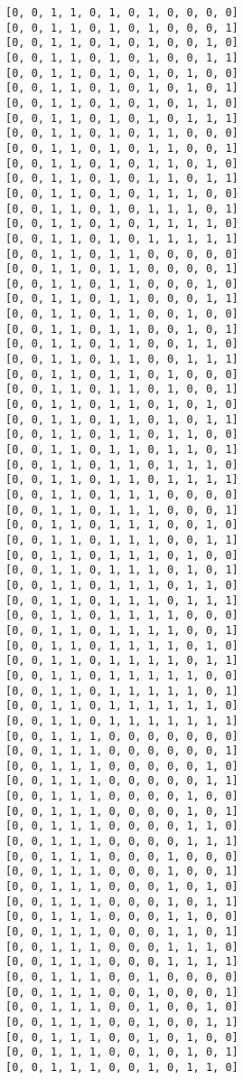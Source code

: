 \documentclass[11pt]{article}
\begin{document}
\begin{Verbatim}[commandchars=\\\{\}]
[0, 0, 1, 1, 0, 1, 0, 1, 0, 0, 0, 0]
[0, 0, 1, 1, 0, 1, 0, 1, 0, 0, 0, 1]
[0, 0, 1, 1, 0, 1, 0, 1, 0, 0, 1, 0]
[0, 0, 1, 1, 0, 1, 0, 1, 0, 0, 1, 1]
[0, 0, 1, 1, 0, 1, 0, 1, 0, 1, 0, 0]
[0, 0, 1, 1, 0, 1, 0, 1, 0, 1, 0, 1]
[0, 0, 1, 1, 0, 1, 0, 1, 0, 1, 1, 0]
[0, 0, 1, 1, 0, 1, 0, 1, 0, 1, 1, 1]
[0, 0, 1, 1, 0, 1, 0, 1, 1, 0, 0, 0]
[0, 0, 1, 1, 0, 1, 0, 1, 1, 0, 0, 1]
[0, 0, 1, 1, 0, 1, 0, 1, 1, 0, 1, 0]
[0, 0, 1, 1, 0, 1, 0, 1, 1, 0, 1, 1]
[0, 0, 1, 1, 0, 1, 0, 1, 1, 1, 0, 0]
[0, 0, 1, 1, 0, 1, 0, 1, 1, 1, 0, 1]
[0, 0, 1, 1, 0, 1, 0, 1, 1, 1, 1, 0]
[0, 0, 1, 1, 0, 1, 0, 1, 1, 1, 1, 1]
[0, 0, 1, 1, 0, 1, 1, 0, 0, 0, 0, 0]
[0, 0, 1, 1, 0, 1, 1, 0, 0, 0, 0, 1]
[0, 0, 1, 1, 0, 1, 1, 0, 0, 0, 1, 0]
[0, 0, 1, 1, 0, 1, 1, 0, 0, 0, 1, 1]
[0, 0, 1, 1, 0, 1, 1, 0, 0, 1, 0, 0]
[0, 0, 1, 1, 0, 1, 1, 0, 0, 1, 0, 1]
[0, 0, 1, 1, 0, 1, 1, 0, 0, 1, 1, 0]
[0, 0, 1, 1, 0, 1, 1, 0, 0, 1, 1, 1]
[0, 0, 1, 1, 0, 1, 1, 0, 1, 0, 0, 0]
[0, 0, 1, 1, 0, 1, 1, 0, 1, 0, 0, 1]
[0, 0, 1, 1, 0, 1, 1, 0, 1, 0, 1, 0]
[0, 0, 1, 1, 0, 1, 1, 0, 1, 0, 1, 1]
[0, 0, 1, 1, 0, 1, 1, 0, 1, 1, 0, 0]
[0, 0, 1, 1, 0, 1, 1, 0, 1, 1, 0, 1]
[0, 0, 1, 1, 0, 1, 1, 0, 1, 1, 1, 0]
[0, 0, 1, 1, 0, 1, 1, 0, 1, 1, 1, 1]
[0, 0, 1, 1, 0, 1, 1, 1, 0, 0, 0, 0]
[0, 0, 1, 1, 0, 1, 1, 1, 0, 0, 0, 1]
[0, 0, 1, 1, 0, 1, 1, 1, 0, 0, 1, 0]
[0, 0, 1, 1, 0, 1, 1, 1, 0, 0, 1, 1]
[0, 0, 1, 1, 0, 1, 1, 1, 0, 1, 0, 0]
[0, 0, 1, 1, 0, 1, 1, 1, 0, 1, 0, 1]
[0, 0, 1, 1, 0, 1, 1, 1, 0, 1, 1, 0]
[0, 0, 1, 1, 0, 1, 1, 1, 0, 1, 1, 1]
[0, 0, 1, 1, 0, 1, 1, 1, 1, 0, 0, 0]
[0, 0, 1, 1, 0, 1, 1, 1, 1, 0, 0, 1]
[0, 0, 1, 1, 0, 1, 1, 1, 1, 0, 1, 0]
[0, 0, 1, 1, 0, 1, 1, 1, 1, 0, 1, 1]
[0, 0, 1, 1, 0, 1, 1, 1, 1, 1, 0, 0]
[0, 0, 1, 1, 0, 1, 1, 1, 1, 1, 0, 1]
[0, 0, 1, 1, 0, 1, 1, 1, 1, 1, 1, 0]
[0, 0, 1, 1, 0, 1, 1, 1, 1, 1, 1, 1]
[0, 0, 1, 1, 1, 0, 0, 0, 0, 0, 0, 0]
[0, 0, 1, 1, 1, 0, 0, 0, 0, 0, 0, 1]
[0, 0, 1, 1, 1, 0, 0, 0, 0, 0, 1, 0]
[0, 0, 1, 1, 1, 0, 0, 0, 0, 0, 1, 1]
[0, 0, 1, 1, 1, 0, 0, 0, 0, 1, 0, 0]
[0, 0, 1, 1, 1, 0, 0, 0, 0, 1, 0, 1]
[0, 0, 1, 1, 1, 0, 0, 0, 0, 1, 1, 0]
[0, 0, 1, 1, 1, 0, 0, 0, 0, 1, 1, 1]
[0, 0, 1, 1, 1, 0, 0, 0, 1, 0, 0, 0]
[0, 0, 1, 1, 1, 0, 0, 0, 1, 0, 0, 1]
[0, 0, 1, 1, 1, 0, 0, 0, 1, 0, 1, 0]
[0, 0, 1, 1, 1, 0, 0, 0, 1, 0, 1, 1]
[0, 0, 1, 1, 1, 0, 0, 0, 1, 1, 0, 0]
[0, 0, 1, 1, 1, 0, 0, 0, 1, 1, 0, 1]
[0, 0, 1, 1, 1, 0, 0, 0, 1, 1, 1, 0]
[0, 0, 1, 1, 1, 0, 0, 0, 1, 1, 1, 1]
[0, 0, 1, 1, 1, 0, 0, 1, 0, 0, 0, 0]
[0, 0, 1, 1, 1, 0, 0, 1, 0, 0, 0, 1]
[0, 0, 1, 1, 1, 0, 0, 1, 0, 0, 1, 0]
[0, 0, 1, 1, 1, 0, 0, 1, 0, 0, 1, 1]
[0, 0, 1, 1, 1, 0, 0, 1, 0, 1, 0, 0]
[0, 0, 1, 1, 1, 0, 0, 1, 0, 1, 0, 1]
[0, 0, 1, 1, 1, 0, 0, 1, 0, 1, 1, 0]

\end{Verbatim}
\end{document}
